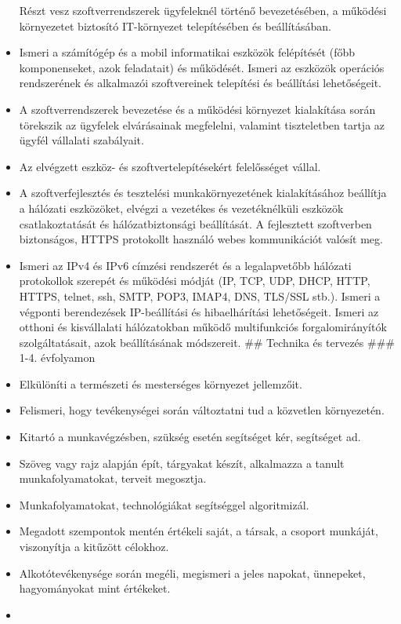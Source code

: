 \begin{itemize}
  Részt vesz szoftverrendszerek ügyfeleknél történő bevezetésében, a
  működési környezetet biztosító IT-környezet telepítésében és
  beállításában.
\item
  Ismeri a számítógép és a mobil informatikai eszközök felépítését (főbb
  komponenseket, azok feladatait) és működését. Ismeri az eszközök
  operációs rendszerének és alkalmazói szoftvereinek telepítési és
  beállítási lehetőségeit.
\item
  A szoftverrendszerek bevezetése és a működési környezet kialakítása
  során törekszik az ügyfelek elvárásainak megfelelni, valamint
  tiszteletben tartja az ügyfél vállalati szabályait.
\item
  Az elvégzett eszköz- és szoftvertelepítésekért felelősséget vállal.
\item
  A szoftverfejlesztés és tesztelési munkakörnyezetének kialakításához
  beállítja a hálózati eszközöket, elvégzi a vezetékes és vezetéknélküli
  eszközök csatlakoztatását és hálózatbiztonsági beállítását. A
  fejlesztett szoftverben biztonságos, HTTPS protokollt használó webes
  kommunikációt valósít meg.
\item
  Ismeri az IPv4 és IPv6 címzési rendszerét és a legalapvetőbb hálózati
  protokollok szerepét és működési módját (IP, TCP, UDP, DHCP, HTTP,
  HTTPS, telnet, ssh, SMTP, POP3, IMAP4, DNS, TLS/SSL stb.). Ismeri a
  végponti berendezések IP-beállítási és hibaelhárítási lehetőségeit.
  Ismeri az otthoni és kisvállalati hálózatokban működő multifunkciós
  forgalomirányítók szolgáltatásait, azok beállításának módszereit. \#\#
  Technika és tervezés \#\#\# 1-4. évfolyamon
\item
  Elkülöníti a természeti és mesterséges környezet jellemzőit.
\item
  Felismeri, hogy tevékenységei során változtatni tud a közvetlen
  környezetén.
\item
  Kitartó a munkavégzésben, szükség esetén segítséget kér, segítséget
  ad.
\item
  Szöveg vagy rajz alapján épít, tárgyakat készít, alkalmazza a tanult
  munkafolyamatokat, terveit megosztja.
\item
  Munkafolyamatokat, technológiákat segítséggel algoritmizál.
\item
  Megadott szempontok mentén értékeli saját, a társak, a csoport
  munkáját, viszonyítja a kitűzött célokhoz.
\item
  Alkotótevékenysége során megéli, megismeri a jeles napokat, ünnepeket,
  hagyományokat mint értékeket.
\item

\end{itemize}
